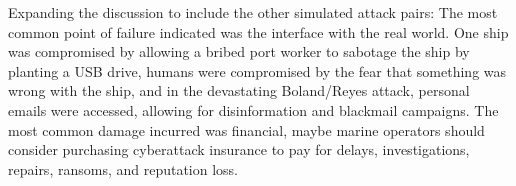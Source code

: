 \documentclass{article}[letterpaper,12pt]
\begin{document}
Expanding the discussion to include the other simulated attack pairs: The most common point of failure indicated was the interface with the real world. One ship was compromised by allowing a bribed port worker to sabotage the ship by planting a USB drive, humans were compromised by the fear that something was wrong with the ship, and in the devastating Boland/Reyes attack, personal emails were accessed, allowing for disinformation and blackmail campaigns. The most common damage incurred was financial, maybe marine operators should consider purchasing cyberattack insurance to pay for delays, investigations, repairs, ransoms, and reputation loss. 
\end{document}
